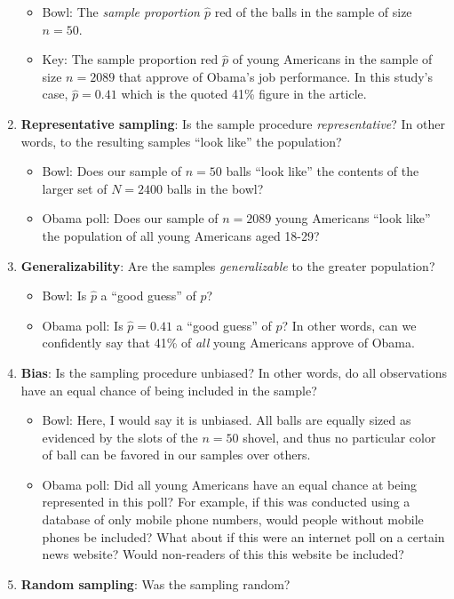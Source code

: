 \documentclass[12pt,]{krantz}
\providecommand{\tightlist}{%
  \setlength{\itemsep}{0pt}\setlength{\parskip}{0pt}}
\begin{document}
\begin{enumerate}
  \begin{itemize}
  \tightlist
  \item
    Bowl: The \emph{sample proportion \(\widehat{p}\)} red of the balls
    in the sample of size \(n=50\).
  \item
    Key: The sample proportion red \(\widehat{p}\) of young Americans in
    the sample of size \(n=2089\) that approve of Obama's job
    performance. In this study's case, \(\widehat{p} = 0.41\) which is
    the quoted 41\% figure in the article.
  \end{itemize}
\item
  \textbf{Representative sampling}: Is the sample procedure
  \emph{representative}? In other words, to the resulting samples ``look
  like'' the population?

  \begin{itemize}
  \tightlist
  \item
    Bowl: Does our sample of \(n=50\) balls ``look like'' the contents
    of the larger set of \(N=2400\) balls in the bowl?
  \item
    Obama poll: Does our sample of \(n=2089\) young Americans ``look
    like'' the population of all young Americans aged 18-29?
  \end{itemize}
\item
  \textbf{Generalizability}: Are the samples \emph{generalizable} to the
  greater population?

  \begin{itemize}
  \tightlist
  \item
    Bowl: Is \(\widehat{p}\) a ``good guess'' of \(p\)?
  \item
    Obama poll: Is \(\widehat{p} = 0.41\) a ``good guess'' of \(p\)? In
    other words, can we confidently say that 41\% of \emph{all} young
    Americans approve of Obama.
  \end{itemize}
\item
  \textbf{Bias}: Is the sampling procedure unbiased? In other words, do
  all observations have an equal chance of being included in the sample?

  \begin{itemize}
  \tightlist
  \item
    Bowl: Here, I would say it is unbiased. All balls are equally sized
    as evidenced by the slots of the \(n=50\) shovel, and thus no
    particular color of ball can be favored in our samples over others.
  \item
    Obama poll: Did all young Americans have an equal chance at being
    represented in this poll? For example, if this was conducted using a
    database of only mobile phone numbers, would people without mobile
    phones be included? What about if this were an internet poll on a
    certain news website? Would non-readers of this this website be
    included?
  \end{itemize}
\item
  \textbf{Random sampling}: Was the sampling random?


\end{enumerate}
\end{document}
